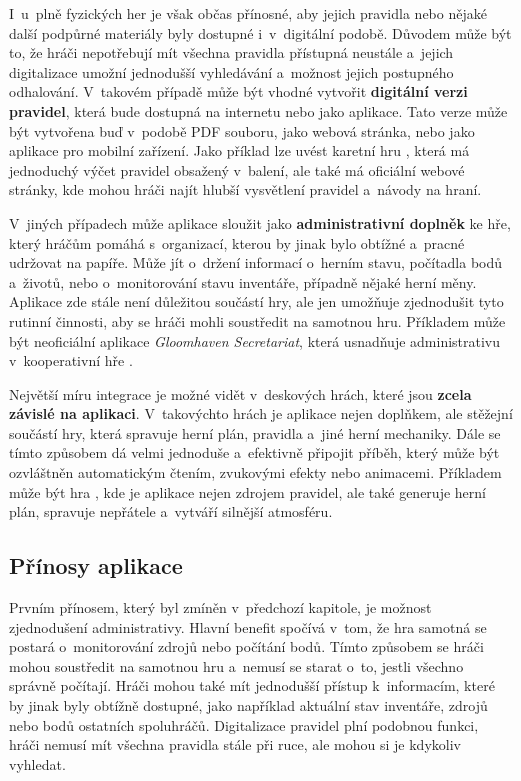 I~u~plně fyzických her je však občas přínosné, aby jejich pravidla nebo nějaké další podpůrné materiály byly dostupné i~v~digitální podobě. Důvodem může být to, že hráči nepotřebují mít všechna pravidla přístupná neustále a~jejich digitalizace umožní jednodušší vyhledávání a~možnost jejich postupného odhalování. V~takovém případě může být vhodné vytvořit \textbf{digitální verzi pravidel}, která bude dostupná na internetu nebo jako aplikace. Tato verze může být vytvořena buď v~podobě PDF souboru, jako webová stránka, nebo jako aplikace pro mobilní zařízení. Jako příklad lze uvést karetní hru , která má jednoduchý výčet pravidel obsažený v~balení, ale také má oficiální webové stránky, kde mohou hráči najít hlubší vysvětlení pravidel a~návody na hraní.

V~jiných případech může aplikace sloužit jako \textbf{administrativní doplněk} ke hře, který hráčům pomáhá s~organizací, kterou by jinak bylo obtížné a~pracné udržovat na papíře. Může jít o~držení informací o~herním stavu, počítadla bodů a~životů, nebo o~monitorování stavu inventáře, případně nějaké herní měny. Aplikace zde stále není důležitou součástí hry, ale jen umožňuje zjednodušit tyto rutinní činnosti, aby se hráči mohli soustředit na samotnou hru. Příkladem může být neoficiální aplikace \textit{Gloomhaven Secretariat}, která usnadňuje administrativu v~kooperativní hře . \cite{gloomhaven_secretariat}

Největší míru integrace je možné vidět v~deskových hrách, které jsou \textbf{zcela závislé na aplikaci}. V~takovýchto hrách je aplikace nejen doplňkem, ale stěžejní součástí hry, která spravuje herní plán, pravidla a~jiné herní mechaniky. Dále se tímto způsobem dá velmi jednoduše a~efektivně připojit příběh, který může být ozvláštněn automatickým čtením, zvukovými efekty nebo animacemi. Příkladem může být hra , kde je aplikace nejen zdrojem pravidel, ale také generuje herní plán, spravuje nepřátele a~vytváří silnější atmosféru.

\subsection{Přínosy aplikace}
\label{subsec:apps_app_benefits}

Prvním přínosem, který byl zmíněn v~předchozí kapitole, je možnost zjednodušení administrativy. Hlavní benefit spočívá v~tom, že hra samotná se postará o~monitorování zdrojů nebo počítání bodů. Tímto způsobem se hráči mohou soustředit na samotnou hru a~nemusí se starat o~to, jestli všechno správně počítají. Hráči mohou také mít jednodušší přístup k~informacím, které by jinak byly obtížně dostupné, jako například aktuální stav inventáře, zdrojů nebo bodů ostatních spoluhráčů. Digitalizace pravidel plní podobnou funkci, hráči nemusí mít všechna pravidla stále při ruce, ale mohou si je kdykoliv vyhledat.

